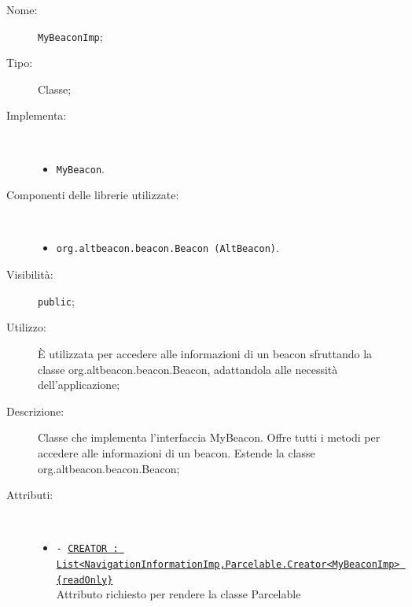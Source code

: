 \documentclass[../DefinizioneDiProdotto.tex]{subfiles}
\begin{document}
    \begin{description}
\item[Nome:] \texttt{MyBeaconImp};
\item[Tipo:] Classe;
\item[Implementa:] \
\begin{itemize}
\item \texttt{MyBeacon}.

\end{itemize}
\item[Componenti delle librerie utilizzate:] \
\begin{itemize}
\item \texttt{org.altbeacon.beacon.Beacon (AltBeacon)}.

\end{itemize}
\item[Visibilità:] \texttt{public};
\item[Utilizzo:] È utilizzata per accedere alle informazioni di un beacon sfruttando la classe org.altbeacon.beacon.Beacon, adattandola alle necessità dell'applicazione;
\item[Descrizione:] Classe che implementa l'interfaccia MyBeacon. Offre tutti i metodi per accedere alle informazioni di un beacon. Estende la classe org.altbeacon.beacon.Beacon;
\item[Attributi:] \
\begin{itemize}
\item \texttt{- \underline{CREATOR : List<NavigationInformationImp,Parcelable.Creator<MyBeaconImp> \{readOnly\}}}\\
Attributo richiesto per rendere la classe Parcelable


\end{itemize}
\end{description}
\end{document}
